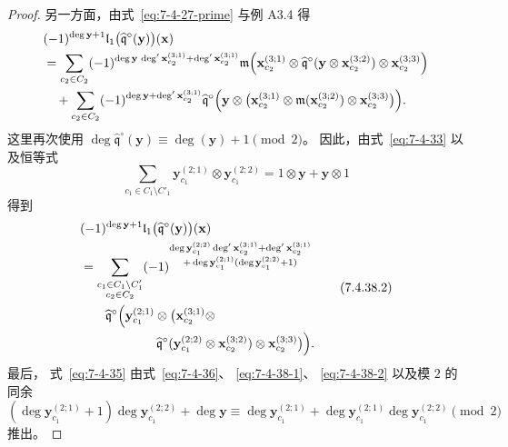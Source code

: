 \begin{proof}
另一方面，由式~\eqref{eq:7-4-27-prime}
与例 A3.4 得
\[
\begin{aligned}
&(-1)^{\deg\mathbf y+1}
\mathfrak l_1\bigl(
\widehat{\mathfrak q}^{\circ}
(\mathbf y)\bigr)(\mathbf x)\\
&=\sum_{c_2\in C_2}
(-1)^{\deg\mathbf y\,\deg'\mathbf x_{c_2}^{(3;1)}
+\deg'\mathbf x_{c_2}^{(3;1)}}
\mathfrak m\Bigl(
\mathbf x_{c_2}^{(3;1)}
\otimes
\widehat{\mathfrak q}^{\circ}
(\mathbf y\otimes\mathbf x_{c_2}^{(3;2)})
\otimes\mathbf x_{c_2}^{(3;3)}
\Bigr)\\
&\quad+
\sum_{c_2\in C_2}
(-1)^{\deg\mathbf y+
\deg'\mathbf x_{c_2}^{(3;1)}}
\widehat{\mathfrak q}^{\circ}
\Bigl(\mathbf y\otimes\bigl(
\mathbf x_{c_2}^{(3;1)}
\otimes\mathfrak m
(\mathbf x_{c_2}^{(3;2)})
\otimes\mathbf x_{c_2}^{(3;3)}
\bigr)\Bigr).
\end{aligned}
\]
这里再次使用
$\deg\widehat{\mathfrak q}^{\circ}
(\mathbf y)
\equiv\deg(\mathbf y)+1\pmod2$。
因此，由式~\eqref{eq:7-4-33}
以及恒等式
\[
\sum_{c_1\in C_1\setminus C'_1}
\mathbf y_{c_1}^{(2;1)}
\otimes\mathbf y_{c_1}^{(2;2)}
=1\otimes\mathbf y
+\mathbf y\otimes1
\]
得到
\begin{equation}
\begin{aligned}
&(-1)^{\deg\mathbf y+1}
\mathfrak l_1\bigl(
\widehat{\mathfrak q}^{\circ}
(\mathbf y)\bigr)(\mathbf x)\\
&=\sum_{\substack{
c_1\in C_1\setminus C'_1\\
c_2\in C_2}}
(-1)^{\substack{
\deg\mathbf y_{c_1}^{(2;2)}
\deg'\mathbf x_{c_2}^{(3;1)}
+\deg'\mathbf x_{c_2}^{(3;1)}\\
+\deg\mathbf y_{c_1}^{(2;1)}
(\deg\mathbf y_{c_1}^{(2;2)}+1)}}\\
&\qquad
\widehat{\mathfrak q}^{\circ}
\Bigl(\mathbf y_{c_1}^{(2;1)}
\otimes\bigl(
\mathbf x_{c_2}^{(3;1)}\otimes\\
&\hspace{6em}
\widehat{\mathfrak q}^{\circ}
(\mathbf y_{c_1}^{(2;2)}
\otimes\mathbf x_{c_2}^{(3;2)})
\otimes\mathbf x_{c_2}^{(3;3)}
\bigr)\Bigr).
\end{aligned}
\tag{7.4.38.2}\label{eq:7-4-38-2}
\end{equation}
最后，
式~\eqref{eq:7-4-35}
由式~\eqref{eq:7-4-36}、
\eqref{eq:7-4-38-1}、
\eqref{eq:7-4-38-2}
以及模 $2$ 的同余
\[
(\deg\mathbf y_{c_1}^{(2;1)}+1)
\deg\mathbf y_{c_1}^{(2;2)}
+\deg\mathbf y
\equiv
\deg\mathbf y_{c_1}^{(2;1)}
+\deg\mathbf y_{c_1}^{(2;1)}
\deg\mathbf y_{c_1}^{(2;2)}
\pmod2
\]
推出。
\end{proof}

